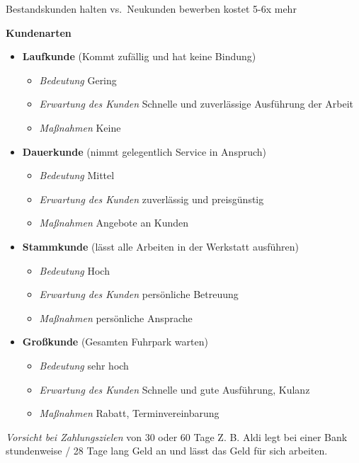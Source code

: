 Bestandskunden halten vs.~Neukunden bewerben kostet 5-6x mehr

\textbf{Kundenarten}

\begin{itemize}
\item
  \textbf{Laufkunde} (Kommt zufällig und hat keine Bindung)

  \begin{itemize}
  \item
    \emph{Bedeutung} Gering
  \item
    \emph{Erwartung des Kunden} Schnelle und zuverlässige Ausführung der
    Arbeit
  \item
    \emph{Maßnahmen} Keine
  \end{itemize}
\item
  \textbf{Dauerkunde} (nimmt gelegentlich Service in Anspruch)

  \begin{itemize}
  \item
    \emph{Bedeutung} Mittel
  \item
    \emph{Erwartung des Kunden} zuverlässig und preisgünstig
  \item
    \emph{Maßnahmen} Angebote an Kunden
  \end{itemize}
\item
  \textbf{Stammkunde} (lässt alle Arbeiten in der Werkstatt ausführen)

  \begin{itemize}
  \item
    \emph{Bedeutung} Hoch
  \item
    \emph{Erwartung des Kunden} persönliche Betreuung
  \item
    \emph{Maßnahmen} persönliche Ansprache
  \end{itemize}
\item
  \textbf{Großkunde} (Gesamten Fuhrpark warten)

  \begin{itemize}
  \item
    \emph{Bedeutung} sehr hoch
  \item
    \emph{Erwartung des Kunden} Schnelle und gute Ausführung, Kulanz
  \item
    \emph{Maßnahmen} Rabatt, Terminvereinbarung
  \end{itemize}
\end{itemize}

\emph{Vorsicht bei Zahlungszielen} von 30 oder 60 Tage Z. B. Aldi legt
bei einer Bank stundenweise / 28 Tage lang Geld an und lässt das Geld
für sich arbeiten.

